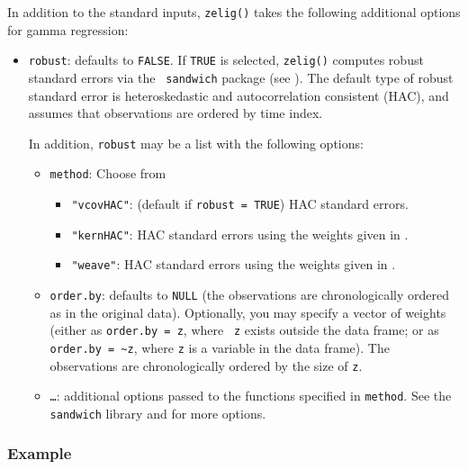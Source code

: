 In addition to the standard inputs, {\tt zelig()} takes the following
additional options for gamma regression:  
\begin{itemize}
\item {\tt robust}: defaults to {\tt FALSE}.  If {\tt TRUE} is
selected, {\tt zelig()} computes robust standard errors via the {\tt
sandwich} package (see \cite{Zeileis04}).  The default type of robust
standard error is heteroskedastic and autocorrelation consistent (HAC),
and assumes that observations are ordered by time index.

In addition, {\tt robust} may be a list with the following options:  
\begin{itemize}
\item {\tt method}:  Choose from 
\begin{itemize}
\item {\tt "vcovHAC"}: (default if {\tt robust = TRUE}) HAC standard
errors. 
\item {\tt "kernHAC"}: HAC standard errors using the
weights given in \cite{Andrews91}. 
\item {\tt "weave"}: HAC standard errors using the
weights given in \cite{LumHea99}.  
\end{itemize}  
\item {\tt order.by}: defaults to {\tt NULL} (the observations are
chronologically ordered as in the original data).  Optionally, you may
specify a vector of weights (either as {\tt order.by = z}, where {\tt
z} exists outside the data frame; or as {\tt order.by = \~{}z}, where
{\tt z} is a variable in the data frame).  The observations are
chronologically ordered by the size of {\tt z}.
\item {\tt \dots}:  additional options passed to the functions 
specified in {\tt method}.   See the {\tt sandwich} library and
\cite{Zeileis04} for more options.   
\end{itemize}
\end{itemize}

\subsubsection{Example}

